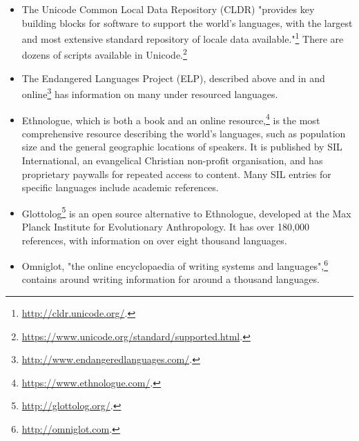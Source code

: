 \begin{itemize}
\item The Unicode Common Local Data Repository (CLDR) "provides key \\ building blocks for software to support the world's languages, with the largest and most extensive standard repository of locale data available."\footnote{\href{http://cldr.unicode.org/}{http://cldr.unicode.org/}. } There are dozens of scripts available in Unicode.\footnote{\href{https://www.unicode.org/standard/supported.html}{https://www.unicode.org/standard/supported.html}. }

\item The Endangered Languages Project (ELP), described above and in \citet{lee2016assessing} and online\footnote{\href{http://www.endangeredlanguages.com/}{http://www.endangeredlanguages.com/}. } has information on many under resourced languages.

\item Ethnologue, which is both a book \citep{lewis2009ethnologue} and an online resource,\footnote{\href{https://www.ethnologue.com/}{https://www.ethnologue.com/}. } is the most comprehensive resource describing the world's languages, such as population size and the general geographic locations of speakers. It is published by SIL International, an evangelical Christian non-profit organisation, and has proprietary paywalls for repeated access to content. Many SIL entries for specific languages include academic references.

\item Glottolog\footnote{\href{http://glottolog.org/}{http://glottolog.org/}. } is an open source alternative to Ethnologue, developed at the Max Planck Institute for Evolutionary Anthropology. It has over 180,000 references, with information on over eight thousand languages. \citep{hammarstrom2015glottolog}

\item Omniglot, "the online encyclopaedia of writing systems and languages",\footnote{\href{http://omniglot.com}{http://omniglot.com}. } contains around writing information for around a thousand languages. \citep{ager2008omniglot}


\end{itemize}
